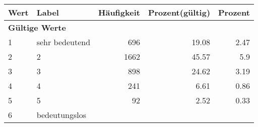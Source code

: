      \begin{longtable}{lXrrr}
     \toprule
     \textbf{Wert} & \textbf{Label} & \textbf{Häufigkeit} & \textbf{Prozent(gültig)} & \textbf{Prozent} \\
     \endhead
     \midrule
     \multicolumn{5}{l}{\textbf{Gültige Werte}}\\

     1 &
     \multicolumn{1}{X}{ sehr bedeutend   } &


       \num{696} &
       \num[round-mode=places,round-precision=2]{19.08} &
         \num[round-mode=places,round-precision=2]{2.47} \\

     2 &
     \multicolumn{1}{X}{ 2   } &


       \num{1662} &
       \num[round-mode=places,round-precision=2]{45.57} &
         \num[round-mode=places,round-precision=2]{5.9} \\

     3 &
     \multicolumn{1}{X}{ 3   } &


       \num{898} &
       \num[round-mode=places,round-precision=2]{24.62} &
         \num[round-mode=places,round-precision=2]{3.19} \\

     4 &
     \multicolumn{1}{X}{ 4   } &


       \num{241} &
       \num[round-mode=places,round-precision=2]{6.61} &
         \num[round-mode=places,round-precision=2]{0.86} \\

     5 &
     \multicolumn{1}{X}{ 5   } &


       \num{92} &
       \num[round-mode=places,round-precision=2]{2.52} &
         \num[round-mode=places,round-precision=2]{0.33} \\

     6 &
     \multicolumn{1}{X}{ bedeutungslos   } &



\end{longtable}
